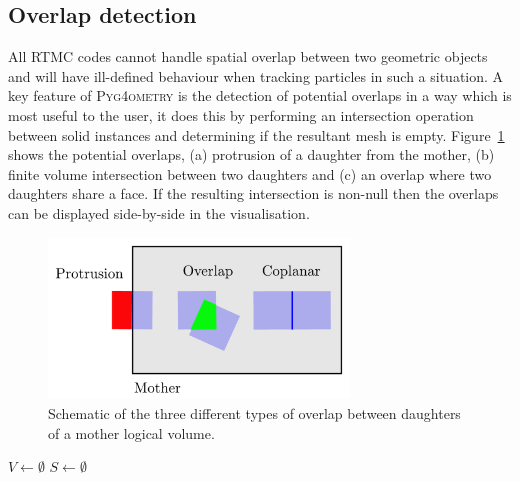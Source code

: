 \documentclass[final,5p,times,twocolumn]{elsarticle}
\newcommand{\PYGEOMETRY}{\textsc{Pyg4ometry}}
\begin{document}
\subsection{Overlap detection}
All RTMC codes cannot handle spatial overlap between two geometric objects and will have ill-defined behaviour when tracking particles  
in such a situation.  A key feature of \PYGEOMETRY{} is the detection of potential overlaps in a way which is most useful to the user, it does this by performing an intersection operation between solid instances and determining if the resultant mesh is empty. Figure~\ref{fig:overlap} shows the potential overlaps, (a) protrusion of a daughter from the mother, (b)  finite volume intersection between two daughters  and (c) an overlap where two daughters share a face. If the resulting intersection 
is non-null then the overlaps can be displayed side-by-side in the visualisation. 
\begin{figure}[htbp]
\begin{center}
\includegraphics[width=8cm]{./diagrams/overlap.pdf}
\caption{Schematic of the three different types of overlap between daughters of a mother logical volume.}
\label{fig:overlap}
\end{center}
\end{figure} 

\begin{algorithm}[h]
  \SetAlgoLined
$V \longleftarrow \emptyset$\;
$S \longleftarrow \emptyset$\;

\label{algo:overlap}
\caption{The overlap checking algorithm employed in \PYGEOMETRY{}.}
\end{algorithm}
\end{document}
